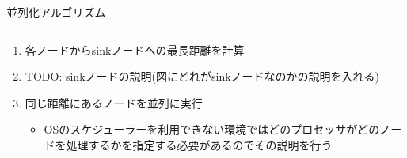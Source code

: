 \documentclass[dvipdfmx,final,t,12pt]{beamer}
\begin{document}
\begin{frame}[fragile]
    \begin{block}{並列化アルゴリズム}
        \begin{columns}
            \begin{column}{0.6\textwidth}
                \begin{enumerate}
                    \item 各ノードからsinkノードへの最長距離を計算
                    \item TODO: sinkノードの説明(図にどれがsinkノードなのかの説明を入れる)
                    \item 同じ距離にあるノードを並列に実行
                        \begin{itemize}
                            \item OSのスケジューラーを利用できない環境ではどのプロセッサがどのノードを処理するかを指定する必要があるのでその説明を行う
                        \end{itemize}
                \end{enumerate}


\end{column}
\end{columns}
\end{block}
\end{frame}
\end{document}
